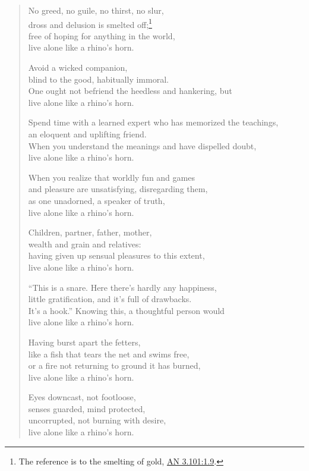 \documentclass[12pt,openany]{book}%
\begin{document}
\begin{verse}
No greed, no guile, no thirst, no slur, \\
dross and delusion is smelted off;\footnote{The reference is to the smelting of gold, \href{https://suttacentral.net/an3.101/en/sujato\#1.9}{AN 3.101:1.9}. } \\
free of hoping for anything in the world, \\
live alone like a rhino’s horn. 

Avoid a wicked companion, \\
blind to the good, habitually immoral. \\
One ought not befriend the heedless and hankering, but \\
live alone like a rhino’s horn. 

Spend time with a learned expert who has memorized the teachings, \\
an eloquent and uplifting friend. \\
When you understand the meanings and have dispelled doubt, \\
live alone like a rhino’s horn. 

When you realize that worldly fun and games \\
and pleasure are unsatisfying, disregarding them, \\
as one unadorned, a speaker of truth, \\
live alone like a rhino’s horn. 

Children, partner, father, mother, \\
wealth and grain and relatives: \\
having given up sensual pleasures to this extent, \\
live alone like a rhino’s horn. 

“This is a snare. Here there’s hardly any happiness, \\
little gratification, and it’s full of drawbacks. \\
It’s a hook.” Knowing this, a thoughtful person would \\
live alone like a rhino’s horn. 

Having burst apart the fetters, \\
like a fish that tears the net and swims free, \\
or a fire not returning to ground it has burned, \\
live alone like a rhino’s horn. 

Eyes downcast, not footloose, \\
senses guarded, mind protected, \\
uncorrupted, not burning with desire, \\
live alone like a rhino’s horn. 


\end{verse}
\end{document}
